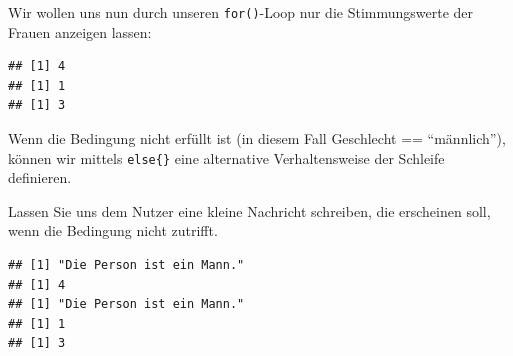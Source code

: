 \documentclass[
]{book}
\newenvironment{Shaded}{\begin{snugshade}}{\end{snugshade}}
\newcommand{\AttributeTok}[1]{\textcolor[rgb]{0.13,0.29,0.53}{#1}}
\newcommand{\ControlFlowTok}[1]{\textcolor[rgb]{0.13,0.29,0.53}{\textbf{#1}}}
\newcommand{\DecValTok}[1]{\textcolor[rgb]{0.00,0.00,0.81}{#1}}
\newcommand{\FunctionTok}[1]{\textcolor[rgb]{0.13,0.29,0.53}{\textbf{#1}}}
\newcommand{\NormalTok}[1]{#1}
\newcommand{\SpecialCharTok}[1]{\textcolor[rgb]{0.81,0.36,0.00}{\textbf{#1}}}
\newcommand{\StringTok}[1]{\textcolor[rgb]{0.31,0.60,0.02}{#1}}
\begin{document}
Wir wollen uns nun durch unseren \texttt{for()}-Loop nur die Stimmungswerte der Frauen anzeigen lassen:

\begin{Shaded}
\end{Shaded}

\begin{verbatim}
## [1] 4
## [1] 1
## [1] 3
\end{verbatim}

Wenn die Bedingung nicht erfüllt ist (in diesem Fall Geschlecht == ``männlich''), können wir mittels \texttt{else\{\}} eine alternative Verhaltensweise der Schleife definieren.

Lassen Sie uns dem Nutzer eine kleine Nachricht schreiben, die erscheinen soll, wenn die Bedingung nicht zutrifft.

\begin{Shaded}
\end{Shaded}

\begin{verbatim}
## [1] "Die Person ist ein Mann."
## [1] 4
## [1] "Die Person ist ein Mann."
## [1] 1
## [1] 3
\end{verbatim}
\end{document}
